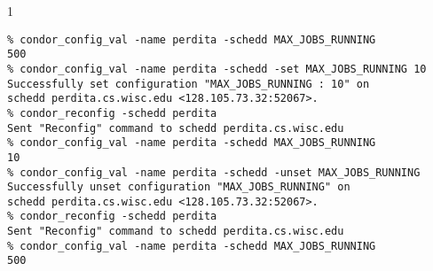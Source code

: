 \begin{ManPage}{\label{man-condor-config-val}}{1}
\Examples

\begin{verbatim}
% condor_config_val -name perdita -schedd MAX_JOBS_RUNNING
500
% condor_config_val -name perdita -schedd -set MAX_JOBS_RUNNING 10
Successfully set configuration "MAX_JOBS_RUNNING : 10" on 
schedd perdita.cs.wisc.edu <128.105.73.32:52067>.
% condor_reconfig -schedd perdita
Sent "Reconfig" command to schedd perdita.cs.wisc.edu
% condor_config_val -name perdita -schedd MAX_JOBS_RUNNING
10
% condor_config_val -name perdita -schedd -unset MAX_JOBS_RUNNING
Successfully unset configuration "MAX_JOBS_RUNNING" on 
schedd perdita.cs.wisc.edu <128.105.73.32:52067>.
% condor_reconfig -schedd perdita
Sent "Reconfig" command to schedd perdita.cs.wisc.edu
% condor_config_val -name perdita -schedd MAX_JOBS_RUNNING
500
\end{verbatim}


\end{ManPage}
